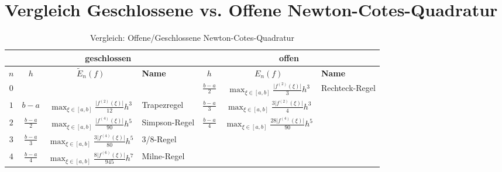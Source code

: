 \documentclass[a4paper, 11pt, accentcolor = tud3b]{tudreport}
\newcommand{\abs}[1]{\ensuremath{{\lvert #1 \rvert}}}
\begin{document}
	    \section{Vergleich Geschlossene vs. Offene Newton-Cotes-Quadratur}
	        \begin{table}[H]
	        	\centering
	        	\begin{tabular}{c | c c l | c c l}
	        		               &                 \multicolumn{3}{c}{\textbf{geschlossen}}                  &                    \multicolumn{3}{c}{\textbf{offen}}                     \\ \hline
	        		\textbf{\(n\)} & \textbf{\(h\)}    & \textbf{\(\tilde{E}_n(f)\)}           & \textbf{Name} & \textbf{\(h\)}    & \textbf{\(E_n(f)\)}                  & \textbf{Name}  \\ \hline
	        		    \(0\)      &                   &                                       &               & \(\frac{b-a}{2}\) & \( \max_{\xi \in [a, b]} \frac{\abs{f^{(2)}(\xi)}}{3} h^3 \)     & Rechteck-Regel \\
	        		    \(1\)      & \(b-a\)           & \( \max_{\xi \in [a, b]} \frac{\abs{f^{(2)}(\xi)}}{12} h^3 \)    & Trapezregel   & \(\frac{b-a}{3}\) & \( \max_{\xi \in [a, b]} \frac{3 \abs{f^{(2)}(\xi)}}{4} h^3 \)   &  \\
	        		    \(2\)      & \(\frac{b-a}{2}\) & \( \max_{\xi \in [a, b]} \frac{\abs{f^{(4)}(\xi)}}{90} h^5 \)    & Simpson-Regel & \(\frac{b-a}{4}\) & \( \max_{\xi \in [a, b]} \frac{28 \abs{f^{(4)}(\xi)}}{90} h^5 \) &  \\
	        		    \(3\)      & \(\frac{b-a}{3}\) & \( \max_{\xi \in [a, b]} \frac{3 \abs{f^{(4)}(\xi)}}{80} h^5 \)  & 3/8-Regel     &                   &                                      &  \\
	        		    \(4\)      & \(\frac{b-a}{4}\) & \( \max_{\xi \in [a, b]} \frac{8 \abs{f^{(6)}(\xi)}}{945} h^7 \) & Milne-Regel   &                   &                                      &
	        	\end{tabular}
	        	\caption{Vergleich: Offene/Geschlossene Newton-Cotes-Quadratur}
	        \end{table}
	
\end{document}
